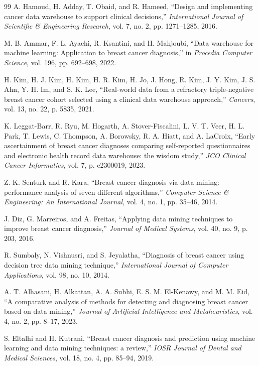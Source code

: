\documentclass[conference]{IEEEtran}
\begin{document}
\begin{thebibliography}{99}
 A. Hamoud, H. Adday, T. Obaid, and R. Hameed, ``Design and implementing cancer data warehouse to support clinical decisions,'' \textit{International Journal of Scientific \& Engineering Research}, vol. 7, no. 2, pp. 1271--1285, 2016.

 M. B. Ammar, F. L. Ayachi, R. Ksantini, and H. Mahjoubi, ``Data warehouse for machine learning: Application to breast cancer diagnosis,'' in \textit{Procedia Computer Science}, vol. 196, pp. 692--698, 2022.

 H. Kim, H. J. Kim, H. Kim, H. R. Kim, H. Jo, J. Hong, R. Kim, J. Y. Kim, J. S. Ahn, Y. H. Im, and S. K. Lee, ``Real-world data from a refractory triple-negative breast cancer cohort selected using a clinical data warehouse approach,'' \textit{Cancers}, vol. 13, no. 22, p. 5835, 2021.

 K. Leggat-Barr, R. Ryu, M. Hogarth, A. Stover-Fiscalini, L. V. T. Veer, H. L. Park, T. Lewis, C. Thompson, A. Borowsky, R. A. Hiatt, and A. LaCroix, ``Early ascertainment of breast cancer diagnoses comparing self-reported questionnaires and electronic health record data warehouse: the wisdom study,'' \textit{JCO Clinical Cancer Informatics}, vol. 7, p. e2300019, 2023.

 Z. K. Senturk and R. Kara, ``Breast cancer diagnosis via data mining: performance analysis of seven different algorithms,'' \textit{Computer Science \& Engineering: An International Journal}, vol. 4, no. 1, pp. 35--46, 2014.

 J. Diz, G. Marreiros, and A. Freitas, ``Applying data mining techniques to improve breast cancer diagnosis,'' \textit{Journal of Medical Systems}, vol. 40, no. 9, p. 203, 2016.

 R. Sumbaly, N. Vishnusri, and S. Jeyalatha, ``Diagnosis of breast cancer using decision tree data mining technique,'' \textit{International Journal of Computer Applications}, vol. 98, no. 10, 2014.

 A. T. Alhasani, H. Alkattan, A. A. Subhi, E. S. M. El-Kenawy, and M. M. Eid, ``A comparative analysis of methods for detecting and diagnosing breast cancer based on data mining,'' \textit{Journal of Artificial Intelligence and Metaheuristics}, vol. 4, no. 2, pp. 8--17, 2023.

 S. Eltalhi and H. Kutrani, ``Breast cancer diagnosis and prediction using machine learning and data mining techniques: a review,'' \textit{IOSR Journal of Dental and Medical Sciences}, vol. 18, no. 4, pp. 85--94, 2019.
\end{thebibliography}
\end{document}
